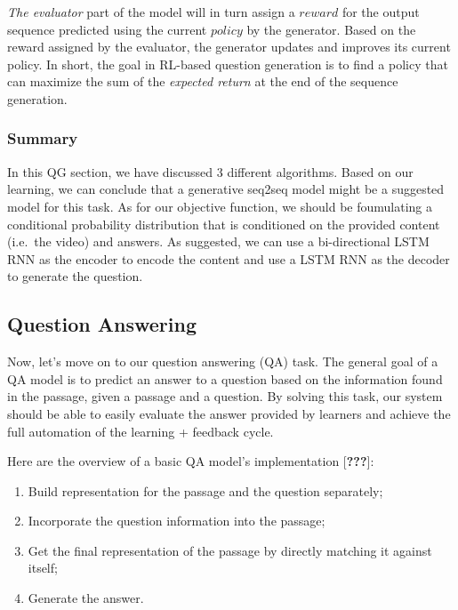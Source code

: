 \documentclass{acm_proc_article-sp}
\begin{document}
\emph{The evaluator} part of the model will in turn assign a \(reward\)
for the output sequence predicted using the current \(policy\) by the
generator. Based on the reward assigned by the evaluator, the generator
updates and improves its current policy. In short, the goal in RL-based
question generation is to find a policy that can maximize the sum of the
\emph{expected return} at the end of the sequence generation.

\subsubsection{Summary}\label{summary}

In this QG section, we have discussed 3 different algorithms. Based on
our learning, we can conclude that a generative seq2seq model might be a
suggested model for this task. As for our objective function, we should
be foumulating a conditional probability distribution that is
conditioned on the provided content (i.e.~the video) and answers. As
suggested, we can use a bi-directional LSTM RNN as the encoder to encode
the content and use a LSTM RNN as the decoder to generate the question.

\subsection{Question Answering}\label{question-answering}

Now, let's move on to our question answering (QA) task. The general goal
of a QA model is to predict an answer to a question based on the
information found in the passage, given a passage and a question. By
solving this task, our system should be able to easily evaluate the
answer provided by learners and achieve the full automation of the
learning + feedback cycle.

Here are the overview of a basic QA model's implementation
{[}{\textbf{???}}{]}:

\begin{enumerate}
\def\labelenumi{\arabic{enumi}.}
\item
  Build representation for the passage and the question separately;
\item
  Incorporate the question information into the passage;
\item
  Get the final representation of the passage by directly matching it
  against itself;
\item
  Generate the answer.
\end{enumerate}
\end{document}
